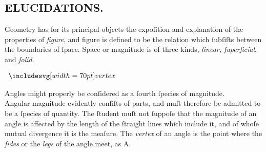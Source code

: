 \begin{minipage}{0.33\textwidth}
    \phantom{}
\end{minipage}%
\begin{minipage}{0.67\textwidth}
    \begin{center}
        \subsection[Elucidations]{\centering \scshape{\LARGE{ELUCIDATIONS.}}}
        \label{subsec:elucidations}
    \end{center}

    \hfill

    \raggedright Geometry has for its principal objects the expoſition and explanation of the properties of \textit{figure}, and figure is defined to be the relation which ſubſiſts between the boundaries of ſpace. Space or magnitude is of three kinds, \textit{linear, ſuperficial}, and \textit{ſolid}.\\
\end{minipage}

\hfill

\begin{minipage}{0.33\textwidth}
    \begin{center}
        $\img[0][0][70]{vertex}$
    \end{center}
\end{minipage}%
\begin{minipage}{0.67\textwidth}
    \raggedright Angles might properly be conſidered as a fourth ſpecies of magnitude.\\ Angular magnitude evidently conſiſts of parts, and muſt therefore be admitted to be a ſpecies of quantity. The ſtudent muſt not ſuppoſe that the magnitude of an angle is affected by the length of the ſtraight lines which include it, and of whoſe mutual divergence it is the meaſure. The \textit{vertex} of an angle is the point where the \textit{ſides} or the \textit{legs} of the angle meet, as A.
\end{minipage}

\hfill

